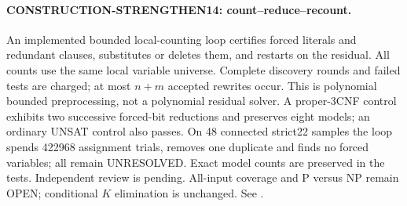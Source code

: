 \paragraph{CONSTRUCTION-STRENGTHEN14: count--reduce--recount.}
An implemented bounded local-counting loop certifies forced literals and
redundant clauses, substitutes or deletes them, and restarts on the residual.
All counts use the same local variable universe. Complete discovery rounds
and failed tests are charged; at most $n+m$ accepted rewrites occur.
This is polynomial bounded preprocessing, not a polynomial residual solver.
A proper-3CNF control exhibits two successive forced-bit reductions and
preserves eight models; an ordinary UNSAT control also passes.
On 48 connected strict22 samples the loop spends 422968 assignment trials,
removes one duplicate and finds no forced variables; all remain UNRESOLVED.
Exact model counts are preserved in the tests. Independent review is pending.
All-input coverage and P versus NP remain OPEN; conditional $K$ elimination
is unchanged. See
.

